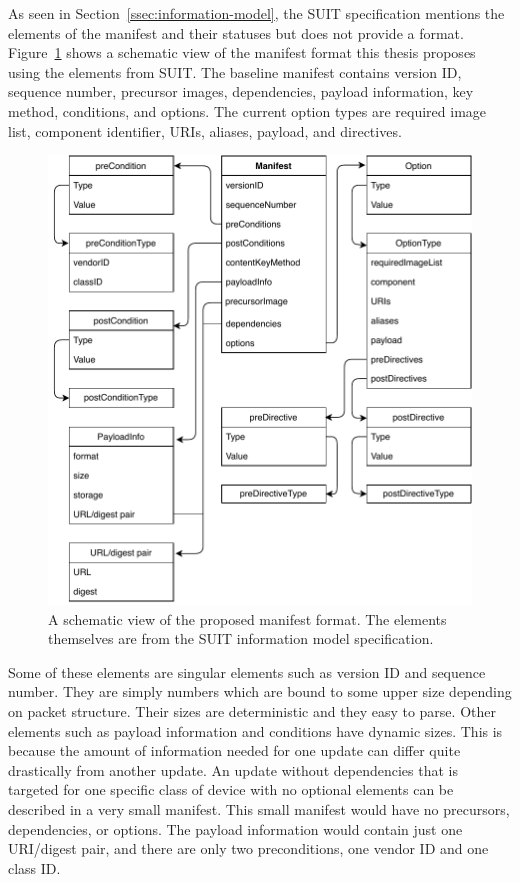 \documentclass[0-thesis.tex]{subfiles}
\begin{document}
As seen in Section~\ref{ssec:information-model}, the SUIT specification mentions the
elements of the manifest and their statuses but does not provide a format.
Figure~\ref{fig:manifest-format} shows a schematic view of the manifest format this thesis
proposes using the elements from SUIT. The baseline manifest contains version ID, sequence
number, precursor images, dependencies, payload information, key method, conditions, and
options. The current option types are required image list, component identifier, URIs,
aliases, payload, and directives.

\begin{figure}
    \caption[A schematic view of the proposed manifest format.]
        {A schematic view of the proposed manifest format. The elements themselves are from the SUIT information model specification.}
    \label{fig:manifest-format}
    \includegraphics{images/manifest-format.pdf}
\end{figure}

Some of these elements are singular elements such as version ID and sequence number. They
are simply numbers which are bound to some upper size depending on packet structure. Their
sizes are deterministic and they easy to parse. Other elements such as payload information
and conditions have dynamic sizes. This is because the amount of information needed for
one update can differ quite drastically from another update. An update without
dependencies that is targeted for one specific class of device with no optional elements
can be described in a very small manifest. This small manifest would have no precursors,
dependencies, or options. The payload information would contain just one URI/digest pair,
and there are only two preconditions, one vendor ID and one class ID.
\end{document}
